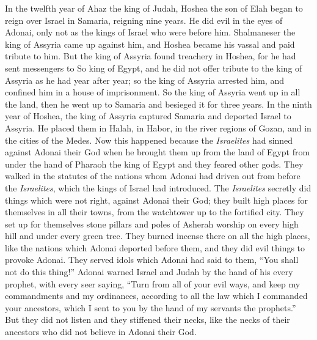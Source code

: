 \begin{biblechapter} %
 In the twelfth year of Ahaz the king of Judah, Hoshea the son of Elah began to reign over Israel in Samaria, reigning nine years.
\verse He did evil in the eyes of Adonai, only not as the kings of Israel who were before him.
\verse Shalmaneser the king of Assyria came up against him, and Hoshea became his vassal and paid tribute to him.
\verse But the king of Assyria found treachery in Hoshea, for he had sent messengers to So king of Egypt, and he did not offer tribute to the king of Assyria as he had year after year; so the king of Assyria arrested him, and confined him in a house of imprisonment.
\verse So the king of Assyria went up in all the land, then he went up to Samaria and besieged it for three years.
 In the ninth year of Hoshea, the king of Assyria captured Samaria and deported Israel to Assyria. He placed them in Halah, in Habor, in the river regions of Gozan, and in the cities of the Medes.
\verse Now this happened because the \textit{Israelites} had sinned against Adonai their God when he brought them up from the land of Egypt from under the hand of Pharaoh the king of Egypt and they feared other gods.
\verse They walked in the statutes of the nations whom Adonai had driven out from before the \textit{Israelites}, which the kings of Israel had introduced.
\verse The \textit{Israelites} secretly did things which were not right, against Adonai their God; they built high places for themselves in all their towns, from the watchtower up to the fortified city.
\verse They set up for themselves stone pillars and poles of Asherah worship on every high hill and under every green tree.
\verse They burned incense there on all the high places, like the nations which Adonai deported before them, and they did evil things to provoke Adonai.
\verse They served idols which Adonai had said to them, “You shall not do this thing!”
\verse Adonai warned Israel and Judah by the hand of his every prophet, with every seer saying, “Turn from all of your evil ways, and keep my commandments and my ordinances, according to all the law which I commanded your ancestors, which I sent to you by the hand of my servants the prophets.”
\verse But they did not listen and they stiffened their necks, like the necks of their ancestors who did not believe in Adonai their God.

\end{biblechapter}
